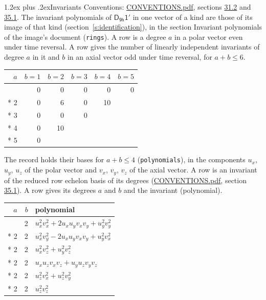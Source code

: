 \documentclass[10pt,a4paper]{article}
\makeatletter
\renewcommand\section{\@startsection{section}{1}{\z@}{-3ex plus -1ex minus -.2ex}%
  {1.2ex plus .2ex}{\normalfont\large\sffamily\bfseries\color{parttitle}}}
\numberwithin{equation}{section}
\newcommand{\grp}[1]{\mathsf{#1}}
\makeatother
\begin{document}
\section{Invariants}\label{s:invariants}
Conventions: \href{../../CONVENTIONS.pdf}{CONVENTIONS.pdf}, sections \href{../../CONVENTIONS.pdf\#conv.31.2}{31.2} and \href{../../CONVENTIONS.pdf\#conv.35.1}{35.1}.
The invariant polynomials of $\grp{D_{9h}1'}$ in one vector of a kind are those of its image of that kind (section~\ref{s:identification}), in the section Invariant polynomials of the image's document (\texttt{rings}).
\leavevmode\label{n:index.degree.polar}\label{n:index.degree.axial}A row is a degree $a$ in a polar vector even under time reversal. A row gives the number of linearly independent invariants of degree $a$ in it and $b$ in an axial vector odd under time reversal, for $a + b \le 6$.
{\small\begin{longtable}{@{}rrrrrr@{}}\toprule
$a$ & $b = 1$ & $b = 2$ & $b = 3$ & $b = 4$ & $b = 5$\\\midrule\endhead
\bottomrule\endfoot\endlastfoot
1 & 0 & 0 & 0 & 0 & 0\\*
2 & 0 & 6 & 0 & 10 & \\*
3 & 0 & 0 & 0 &  & \\*
4 & 0 & 10 &  &  & \\*
5 & 0 &  &  &  & \\
\bottomrule\end{longtable}}
\leavevmode\label{n:local.component.polar}\label{n:local.component.axial}The record holds their bases for $a + b \le 4$ (\texttt{polynomials}), in the components $u_{x}$, $u_{y}$, $u_{z}$ of the polar vector and $v_{x}$, $v_{y}$, $v_{z}$ of the axial vector. \label{n:head.polynomial}A row is an invariant of the reduced row echelon basis of its degrees (\href{../../CONVENTIONS.pdf}{CONVENTIONS.pdf}, section \href{../../CONVENTIONS.pdf\#conv.35.1}{35.1}). A row gives its degrees $a$ and $b$ and the invariant (polynomial).
{\small\renewcommand{\arraystretch}{1.2}\begin{longtable}{@{}rrl@{}}\toprule
$a$ & $b$ & polynomial\\\midrule\endhead
\bottomrule\endfoot\endlastfoot
2 & 2 & $u_{x}^{2}v_{x}^{2} + 2u_{x}u_{y}v_{x}v_{y} + u_{y}^{2}v_{y}^{2}$\\*
2 & 2 & $u_{x}^{2}v_{y}^{2} - 2u_{x}u_{y}v_{x}v_{y} + u_{y}^{2}v_{x}^{2}$\\*
2 & 2 & $u_{x}^{2}v_{z}^{2} + u_{y}^{2}v_{z}^{2}$\\*
2 & 2 & $u_{x}u_{z}v_{x}v_{z} + u_{y}u_{z}v_{y}v_{z}$\\*
2 & 2 & $u_{z}^{2}v_{x}^{2} + u_{z}^{2}v_{y}^{2}$\\*
2 & 2 & $u_{z}^{2}v_{z}^{2}$\\
\bottomrule\end{longtable}}
\end{document}
